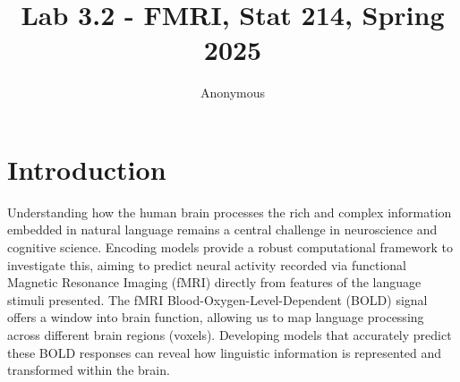 \documentclass[10pt,letterpaper]{article}
\title{Lab 3.2 - FMRI, Stat 214, Spring 2025}
\author{Anonymous}
\begin{document}
\maketitle

\section{Introduction}



Understanding how the human brain processes the rich and complex information embedded in natural language remains a central challenge in neuroscience and cognitive science. Encoding models provide a robust computational framework to investigate this, aiming to predict neural activity recorded via functional Magnetic Resonance Imaging (fMRI) directly from features of the language stimuli presented. The fMRI Blood-Oxygen-Level-Dependent (BOLD) signal offers a window into brain function, allowing us to map language processing across different brain regions (voxels). Developing models that accurately predict these BOLD responses can reveal how linguistic information is represented and transformed within the brain.
\end{document}
